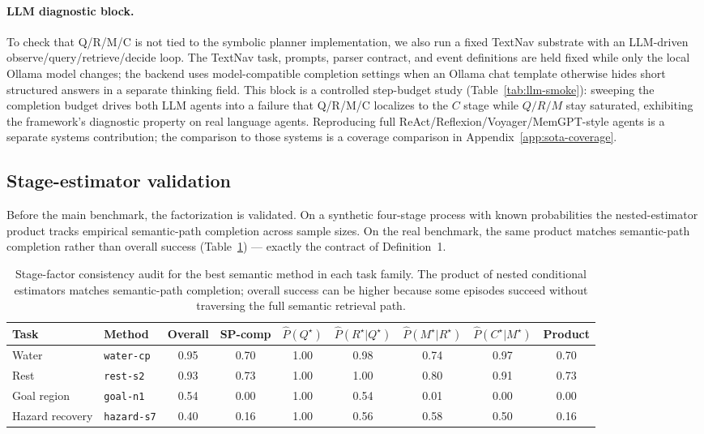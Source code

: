 \documentclass{article}
\begin{document}
\paragraph{LLM diagnostic block.}
To check that Q/R/M/C is not tied to the symbolic planner implementation, we also run a fixed TextNav substrate with an LLM-driven observe/query/retrieve/decide loop. The TextNav task, prompts, parser contract, and event definitions are held fixed while only the local Ollama model changes; the backend uses model-compatible completion settings when an Ollama chat template otherwise hides short structured answers in a separate thinking field. This block is a controlled step-budget study (Table~\ref{tab:llm-smoke}): sweeping the completion budget drives both LLM agents into a failure that Q/R/M/C localizes to the $C$ stage while $Q/R/M$ stay saturated, exhibiting the framework's diagnostic property on real language agents. Reproducing full ReAct/Reflexion/Voyager/MemGPT-style agents is a separate systems contribution; the comparison to those systems is a coverage comparison in Appendix~\ref{app:sota-coverage}.

\subsection{Stage-estimator validation}
\label{sec:validation}

Before the main benchmark, the factorization is validated. On a
synthetic four-stage process with known probabilities the
nested-estimator product tracks empirical semantic-path completion
across sample sizes. On the real benchmark, the same product matches
semantic-path completion rather than overall success
(Table~\ref{tab:consistency}) --- exactly the contract of
Definition~1.

\begin{table}[t]
  \caption{Stage-factor consistency audit for the best semantic method in each task family. The product of nested conditional estimators matches semantic-path completion; overall success can be higher because some episodes succeed without traversing the full semantic retrieval path.}
  \label{tab:consistency}
  \centering
  \small
  \begin{tabular}{p{1.7cm}p{2.5cm}c c c c c c c}
    \toprule
    Task & Method & Overall & SP-comp & $\hat P(Q^\star)$ & $\hat P(R^\star|Q^\star)$ & $\hat P(M^\star|R^\star)$ & $\hat P(C^\star|M^\star)$ & Product \\
    \midrule
    Water & \texttt{water-cp} & 0.95 & 0.70 & 1.00 & 0.98 & 0.74 & 0.97 & 0.70 \\
    Rest & \texttt{rest-s2} & 0.93 & 0.73 & 1.00 & 1.00 & 0.80 & 0.91 & 0.73 \\
    Goal region & \texttt{goal-n1} & 0.54 & 0.00 & 1.00 & 0.54 & 0.01 & 0.00 & 0.00 \\
    Hazard recovery & \texttt{hazard-s7} & 0.40 & 0.16 & 1.00 & 0.56 & 0.58 & 0.50 & 0.16 \\
    \bottomrule
  \end{tabular}
\end{table}
\end{document}
